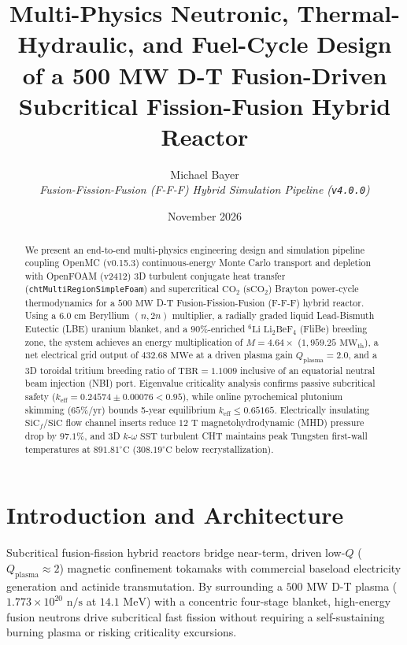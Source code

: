 \documentclass[11pt,twocolumn]{article}
\title{\textbf{Multi-Physics Neutronic, Thermal-Hydraulic, and Fuel-Cycle Design of a 500 MW D-T Fusion-Driven Subcritical Fission-Fusion Hybrid Reactor}}
\author{Michael Bayer \\ \small\textit{Fusion-Fission-Fusion (F-F-F) Hybrid Simulation Pipeline (\texttt{v4.0.0})}}
\date{November 2026}
\begin{document}
\maketitle

\begin{abstract}
We present an end-to-end multi-physics engineering design and simulation pipeline coupling OpenMC (v0.15.3) continuous-energy Monte Carlo transport and depletion with OpenFOAM (v2412) 3D turbulent conjugate heat transfer (\texttt{chtMultiRegionSimpleFoam}) and supercritical $\mathrm{CO}_2$ ($\mathrm{sCO}_2$) Brayton power-cycle thermodynamics for a $500\text{ MW}$ D-T Fusion-Fission-Fusion (F-F-F) hybrid reactor. Using a $6.0\text{ cm}$ Beryllium $(n,2n)$ multiplier, a radially graded liquid Lead-Bismuth Eutectic (LBE) uranium blanket, and a $90\%$-enriched $^6\mathrm{Li}$ $\mathrm{Li}_2\mathrm{BeF}_4$ (FliBe) breeding zone, the system achieves an energy multiplication of $M = 4.64\times$ ($1,959.25\text{ MW}_{\text{th}}$), a net electrical grid output of $432.68\text{ MWe}$ at a driven plasma gain $Q_{\text{plasma}} = 2.0$, and a 3D toroidal tritium breeding ratio of $\mathrm{TBR} = 1.1009$ inclusive of an equatorial neutral beam injection (NBI) port. Eigenvalue criticality analysis confirms passive subcritical safety ($k_{\text{eff}} = 0.24574 \pm 0.00076 < 0.95$), while online pyrochemical plutonium skimming ($65\%/\text{yr}$) bounds 5-year equilibrium $k_{\text{eff}} \le 0.65165$. Electrically insulating $\mathrm{SiC}_f/\mathrm{SiC}$ flow channel inserts reduce $12\text{ T}$ magnetohydrodynamic (MHD) pressure drop by $97.1\%$, and 3D $k\text{-}\omega\text{ SST}$ turbulent CHT maintains peak Tungsten first-wall temperatures at $891.81^\circ\text{C}$ ($308.19^\circ\text{C}$ below recrystallization).
\end{abstract}

\section{Introduction and Architecture}
Subcritical fusion-fission hybrid reactors bridge near-term, driven low-$Q$ ($Q_{\text{plasma}} \approx 2$) magnetic confinement tokamaks with commercial baseload electricity generation and actinide transmutation. By surrounding a $500\text{ MW}$ D-T plasma ($1.773 \times 10^{20}\text{ n/s}$ at $14.1\text{ MeV}$) with a concentric four-stage blanket, high-energy fusion neutrons drive subcritical fast fission without requiring a self-sustaining burning plasma or risking criticality excursions.
\end{document}
